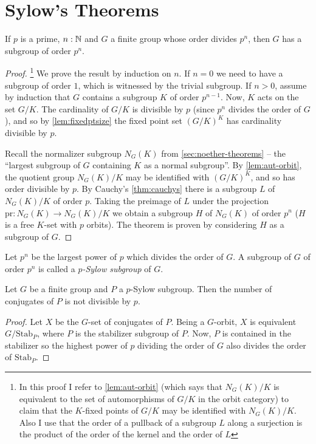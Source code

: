 \section{Sylow's Theorems}
\label{sec:sylow}
\begin{theorem}
  \label{thm:sylow1}
  If $p$ is a prime, $n:\mathbb{N}$ and $G$ a finite group whose order divides $p^n$, then $G$ has a subgroup of order $p^n$.
\end{theorem}
\begin{proof}\footnote{In this proof I refer to \cref{lem:aut-orbit} (which says that $N_G(K)/K$ is equivalent to the set of automorphisms of $G/K$ in the orbit category) to claim that the $K$-fixed points of $G/K$ may be identified with $N_G(K)/K$.   Also I use that the order of a pullback of a subgroup $L$ along a surjection is the product of the order of the kernel and the order of $L$}
  We prove the result by induction on $n$.  
If $n=0$ we need to have a subgroup of order $1$, which is witnessed by the trivial subgroup.
If $n>0$, assume by induction that $G$ contains a subgroup $K$ of order $p^{n-1}$.  
Now, $K$ acts on the set $G/K$.  
The cardinality of $G/K$ is divisible by $p$ (since $p^n$ divides the order of $G$), and so by \cref{lem:fixedptsize} the fixed point set $(G/K)^K$ has cardinality divisible by $p$.  

Recall the normalizer subgroup $N_G(K)$ from \cref{sec:noether-theorems} -- the ``largest subgroup of $G$ containing $K$ as a normal subgroup''.
By \cref{lem:aut-orbit}, the quotient group $N_G(K)/K$ may be identified with $(G/K)^K$, and so has order divisible by $p$.  
By Cauchy's \cref{thm:cauchys} there is a subgroup $L$ of $N_G(K)/K$ of order $p$.  
Taking the preimage of $L$ under the projection $\mathrm{pr}:N_G(K)\to N_G(K)/K$ we obtain a subgroup $H$ of $N_G(K)$ of order $p^n$ ($H$ is a free $K$-set with $p$ orbits).  The theorem is proven by considering $H$ as a subgroup of $G$.
\end{proof}
\begin{definition}
  \label{def:sylowsubgroup}
  Let $p^n$ be the largest power of $p$ which divides the order of $G$.  A subgroup of $G$ of order $p^n$ is called a \emph{$p$-Sylow subgroup} of $G$.
\end{definition}
\begin{lemma}
  \label{lem:numberofconjofSylow}
  Let $G$ be a finite group and $P$ a $p$-Sylow subgroup.  Then the number of conjugates of $P$ is not divisible by $p$.
\end{lemma}
\begin{proof}
  Let $X$ be the $G$-set of conjugates of $P$.  Being a $G$-orbit, $X$ is equivalent $G/\mathrm{Stab}_P$, where $P$ is the stabilizer subgroup of $P$.  Now, $P$ is contained in the stabilizer so the highest power of $p$ dividing the order of $G$ also divides the order of $\mathrm{Stab}_P$.
\end{proof}


